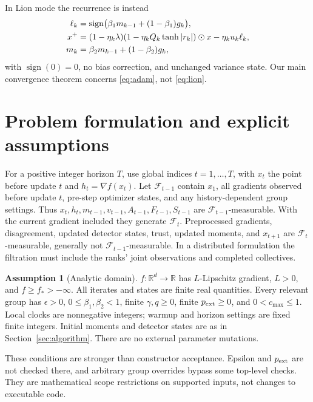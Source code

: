 \documentclass[11pt]{article}
\theoremstyle{definition}
\newtheorem{assumption}[theorem]{Assumption}
\theoremstyle{remark}
\newcommand{\R}{\mathbb R}
\newcommand{\sgn}{\operatorname{sign}}
\begin{document}
In Lion mode the recurrence is instead
\begin{align}
 \ell_k&=\sgn\bigl(\beta_1m_{k-1}+(1-\beta_1)g_k\bigr),\label{eq:lion}\\
 x^+&=(1-\eta_k\lambda)(1-\eta_kQ_k\tanh|r_k|)\odot x-\eta_k u_k\ell_k,\notag\\
 m_k&=\beta_2m_{k-1}+(1-\beta_2)g_k,\notag
\end{align}
with $\sgn(0)=0$, no bias correction, and unchanged variance state. Our main
convergence theorem concerns \eqref{eq:adam}, not \eqref{eq:lion}.

\section{Problem formulation and explicit assumptions}\label{sec:assumptions}
For a positive integer horizon $T$, use global indices $t=1,\ldots,T$, with $x_t$ the point before update $t$ and
$h_t=\nabla f(x_t)$. Let $\mathcal F_{t-1}$ contain $x_1$, all gradients observed
before update $t$, pre-step optimizer states, and any history-dependent group
settings. Thus $x_t,h_t,m_{t-1},v_{t-1},A_{t-1},F_{t-1},S_{t-1}$ are
$\mathcal F_{t-1}$-measurable. With the current gradient included they generate
$\mathcal F_t$. Preprocessed gradients, disagreement, updated detector states,
trust, updated moments, and $x_{t+1}$ are $\mathcal F_t$-measurable, generally
not $\mathcal F_{t-1}$-measurable. In a distributed formulation the filtration
must include the ranks' joint observations and completed collectives.

\begin{assumption}[Analytic domain]\label{ass:domain}
$f:\R^d\to\R$ has $L$-Lipschitz gradient, $L>0$, and $f\ge f_*>-\infty$.
All iterates and states are finite real quantities. Every relevant group has
$\epsilon>0$, $0\le\beta_1,\beta_2<1$, finite $\gamma,q\ge0$, finite
$p_{\rm ext}\ge0$, and $0<c_{\max}\le1$. Local clocks are nonnegative
integers; warmup and horizon settings are fixed finite integers. Initial moments and detector states are as in
Section~\ref{sec:algorithm}. There are no external parameter mutations.
\end{assumption}
These conditions are stronger than constructor acceptance. Epsilon and
$p_{\rm ext}$ are not checked there, and arbitrary group overrides bypass
some top-level checks. They are mathematical scope restrictions on supported
inputs, not changes to executable code.
\end{document}
